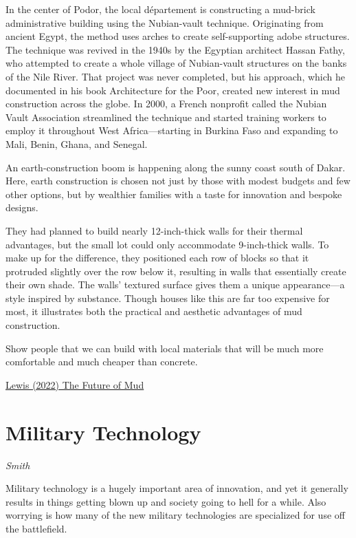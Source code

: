 \documentclass[
]{book}
\begin{document}
In the center of Podor, the local département is constructing a mud-brick administrative building using the Nubian-vault technique. Originating from ancient Egypt, the method uses arches to create self-supporting adobe structures. The technique was revived in the 1940s by the Egyptian architect Hassan Fathy, who attempted to create a whole village of Nubian-vault structures on the banks of the Nile River. That project was never completed, but his approach, which he documented in his book Architecture for the Poor, created new interest in mud construction across the globe. In 2000, a French nonprofit called the Nubian Vault Association streamlined the technique and started training workers to employ it throughout West Africa---starting in Burkina Faso and expanding to Mali, Benin, Ghana, and Senegal.

An earth-construction boom is happening along the sunny coast south of Dakar. Here, earth construction is chosen not just by those with modest budgets and few other options, but by wealthier families with a taste for innovation and bespoke designs.

They had planned to build nearly 12-inch-thick walls for their thermal advantages, but the small lot could only accommodate 9-inch-thick walls. To make up for the difference, they positioned each row of blocks so that it protruded slightly over the row below it, resulting in walls that essentially create their own shade. The walls' textured surface gives them a unique appearance---a style inspired by substance. Though houses like this are far too expensive for most, it illustrates both the practical and aesthetic advantages of mud construction.

Show people that we can build with local materials that will be much more comfortable and much cheaper than concrete.

\href{https://www.theatlantic.com/science/archive/2022/07/senegal-dakar-construction-mud-architecture/661405/}{Lewis (2022) The Future of Mud}

\hypertarget{military-technology}{%
\chapter{Military Technology}\label{military-technology}}

\emph{Smith}

Military technology is a hugely important area of innovation, and yet it generally results in things getting blown up and society going to hell for a while.
Also worrying is how many of the new military technologies are specialized for use off the battlefield.
\end{document}
